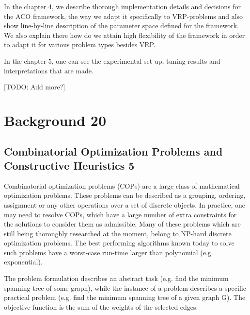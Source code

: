 \documentclass[11pt,a4paper,oneside]{book}
\begin{document}
In the chapter 4, we describe thorough implementation details and decisions for the ACO framework, the way we adapt it specifically to VRP-problems and also show line-by-line description of the parameter space defined for the framework. We also explain there how do we attain high flexibility of the framework in order to adapt it for various problem types besides VRP.

In the chapter 5, one can see the experimental set-up, tuning results and interpretations that are made.

[TODO: Add more?] \newline

\chapter{Background 20}

\section{Combinatorial Optimization Problems and Constructive Heuristics 5}

Combinatorial optimization problems (COPs) are a large class of mathematical optimization problems. These problems can be described as a grouping, ordering, assignment or any other operations over a set of discrete objects. In practice, one may need to resolve COPs, which have a large number of extra constraints for the solutions to consider them as admissible. Many of these problems which are still being thoroughly researched at the moment, belong to NP-hard discrete optimization problems. The best performing algorithms known today to solve such problems have a worst-case run-time larger than polynomial (e.g. exponential).

\noindent{}

The problem formulation describes an abstract task (e.g. find the minimum spanning tree of some graph), while the instance of a problem describes a specific practical problem (e.g. find the minimum spanning tree of a given graph G). The objective function is the sum of the weights of the selected edges. \\
\end{document}
